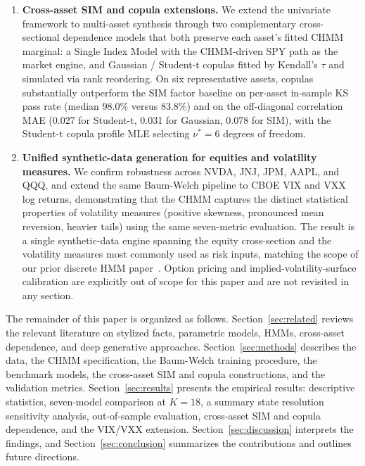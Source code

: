 \begin{enumerate}
    \item \textbf{Cross-asset SIM and copula extensions.}
    We extend the univariate framework to multi-asset synthesis through two complementary cross-sectional dependence models that both preserve each asset's fitted CHMM marginal: a Single Index Model with the CHMM-driven SPY path as the market engine, and Gaussian / Student-t copulas fitted by Kendall's $\tau$ and simulated via rank reordering.
    On six representative assets, copulas substantially outperform the SIM factor baseline on per-asset in-sample KS pass rate (median 98.0\% versus 83.8\%) and on the off-diagonal correlation MAE (0.027 for Student-t, 0.031 for Gaussian, 0.078 for SIM), with the Student-t copula profile MLE selecting $\nu^* = 6$ degrees of freedom.

    \item \textbf{Unified synthetic-data generation for equities and volatility measures.}
    We confirm robustness across NVDA, JNJ, JPM, AAPL, and QQQ, and extend the same Baum-Welch pipeline to CBOE VIX and VXX log returns, demonstrating that the CHMM captures the distinct statistical properties of volatility measures (positive skewness, pronounced mean reversion, heavier tails) using the same seven-metric evaluation.
    The result is a single synthetic-data engine spanning the equity cross-section and the volatility measures most commonly used as risk inputs, matching the scope of our prior discrete HMM paper~\citep{alswaidan2026hybrid}.
    Option pricing and implied-volatility-surface calibration are explicitly out of scope for this paper and are not revisited in any section.
\end{enumerate}

The remainder of this paper is organized as follows.
Section~\ref{sec:related} reviews the relevant literature on stylized facts, parametric models, HMMs, cross-asset dependence, and deep generative approaches.
Section~\ref{sec:methods} describes the data, the CHMM specification, the Baum-Welch training procedure, the benchmark models, the cross-asset SIM and copula constructions, and the validation metrics.
Section~\ref{sec:results} presents the empirical results: descriptive statistics, seven-model comparison at $K = 18$, a summary state resolution sensitivity analysis, out-of-sample evaluation, cross-asset SIM and copula dependence, and the VIX/VXX extension.
Section~\ref{sec:discussion} interprets the findings, and Section~\ref{sec:conclusion} summarizes the contributions and outlines future directions.
